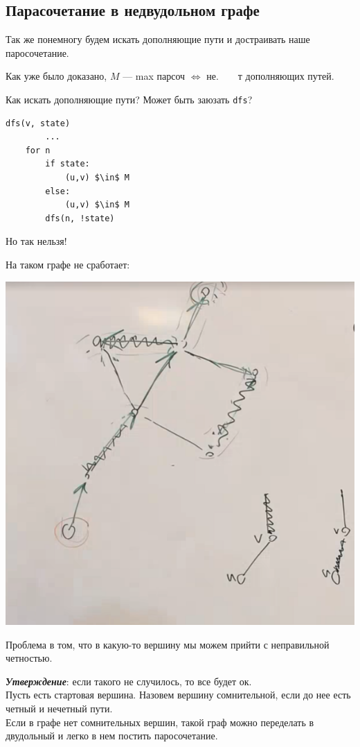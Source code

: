 \subsection{Парасочетание в недвудольном графе}

Так же понемногу будем искать дополняющие пути и достраивать наше паросочетание.

Как уже было доказано, $M$ --- max парсоч $\iff$ не.~~~~т дополняющих путей.

Как искать дополняющие пути? Может быть заюзать \texttt{dfs}?

\begin{lstlisting}[mathescape=true]
    dfs(v, state)
        ...
    for n
        if state:
            (u,v) $\in$ M
        else:
            (u,v) $\in$ M
        dfs(n, !state)
\end{lstlisting}


Но так нельзя!

На таком графе не сработает:

\begin{center}
    \includegraphics[scale=0.6]{img/parsoch_dfs_bad_usage}
\end{center}

Проблема в том, что в какую-то вершину мы можем прийти с неправильной четностью.

\textit{\textbf{Утверждение}}: если такого не случилось, то все будет ок.\\
Пусть есть стартовая вершина.
Назовем вершину сомнительной, если до нее есть четный и нечетный пути. \\
Если в графе нет сомнительных вершин, такой граф можно переделать в двудольный и легко в нем постить паросочетание.

